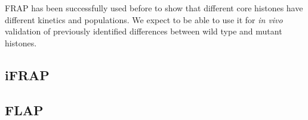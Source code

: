     FRAP has been successfully used before to show that different core histones have
    different kinetics and populations. We expect to be able to use it for \textit{in vivo}
    validation of previously identified differences between wild type and mutant histones.

  \subsection{iFRAP}
  \label{sec:iFRAP}

  \subsection{FLAP}











